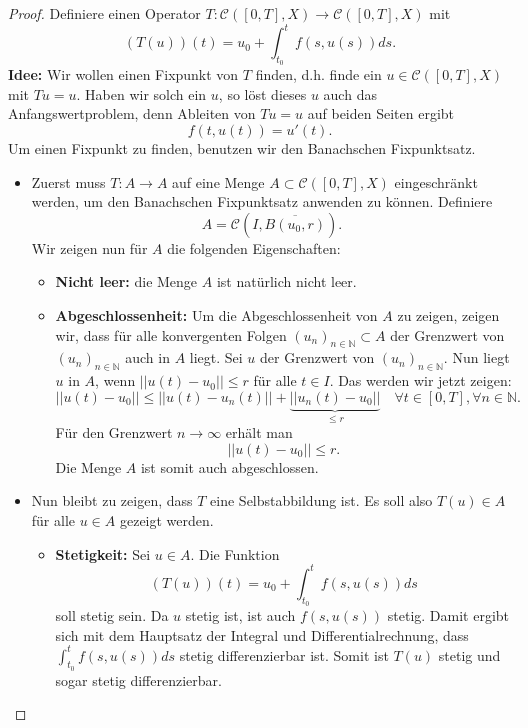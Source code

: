 \documentclass[a4paper]{article}
\theoremstyle{definition}
\begin{document}
\begin{proof}
Definiere einen Operator $T: \mathcal C([0,T], X) \to \mathcal C([0,T], X)$ mit
\[
    (T(u))(t) = u_0 + \int^t_{t_0} f(s, u(s)) ds.
\]
\textbf{Idee:} Wir wollen einen Fixpunkt von $T$ finden, d.h. finde ein $u \in \mathcal C([0,T], X)$ mit $Tu = u$. Haben wir solch ein $u$, so löst dieses $u$ auch das Anfangswertproblem, denn Ableiten von $Tu=u$ auf beiden Seiten ergibt
\[
    f(t,u(t)) = u'(t).
\]
Um einen Fixpunkt zu finden, benutzen wir den Banachschen Fixpunktsatz.

\begin{itemize}
    \item Zuerst muss $T: A \to A$ auf eine Menge $A \subset \mathcal C([0,T], X)$ eingeschränkt werden, um den Banachschen Fixpunktsatz anwenden zu können. Definiere
    \[
        A = \mathcal C(I, \overline{B(u_0, r)}).
    \]
    Wir zeigen nun für $A$ die folgenden Eigenschaften:
    \begin{itemize}
        \item \textbf{Nicht leer:} die Menge $A$ ist natürlich nicht leer.
        \item \textbf{Abgeschlossenheit:} Um die Abgeschlossenheit von $A$ zu zeigen, zeigen wir, dass für alle konvergenten Folgen $(u_n)_{n \in \mathbb N} \subset A$ der Grenzwert von $(u_n)_{n \in \mathbb N}$ auch in $A$ liegt. Sei $u$ der Grenzwert von $(u_n)_{n \in \mathbb N}$. Nun liegt $u$ in $A$, wenn $||u(t) - u_0|| \leq r$ für alle $t \in I$. Das werden wir jetzt zeigen: 
        \[
            || u(t) - u_0|| \leq ||  u(t) - u_n(t)|| + \underbrace{||u_n(t) - u_0||}_{\leq r} \quad \forall t \in [0,T], \forall n \in \mathbb N.
        \]
        Für den Grenzwert $n \to \infty$ erhält man
        \[
             || u(t) - u_0|| \leq r.
        \]
        Die Menge $A$ ist somit auch abgeschlossen.
    \end{itemize}
    \item Nun bleibt zu zeigen, dass $T$ eine Selbstabbildung ist. Es soll also $T(u) \in A$ für alle $u \in A$ gezeigt werden.
    \begin{itemize}
        \item \textbf{Stetigkeit:} Sei $u \in A$. Die Funktion
        \[
            (T(u))(t) = u_0 + \int^t_{t_0}f(s,u(s)) ds
        \]
        soll stetig sein. Da $u$ stetig ist, ist auch $f(s,u(s))$ stetig. Damit ergibt sich mit dem Hauptsatz der Integral und Differentialrechnung, dass $\int^t_{t_0}f(s,u(s)) ds$ stetig differenzierbar ist. Somit ist $T(u)$ stetig und sogar stetig differenzierbar.
        

\end{itemize}
\end{itemize}
\end{proof}
\end{document}
